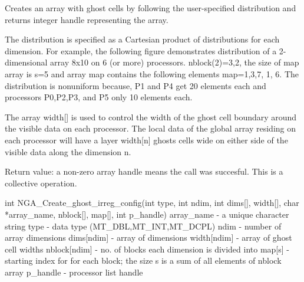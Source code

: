 \documentclass[12pt]{article}
\begin{document}
\begin{desc}

  Creates an array with ghost cells by following the user-specified
  distribution and returns integer handle representing the array.

  The distribution is specified as a Cartesian product of
  distributions for each dimension. For example, the following figure
  demonstrates distribution of a 2-dimensional array 8x10 on 6 (or
  more) processors. nblock(2)={3,2}, the size of map array is s=5 and
  array map contains the following elements map={1,3,7, 1, 6}. The
  distribution is nonuniform because, P1 and P4 get 20 elements each
  and processors P0,P2,P3, and P5 only 10 elements each.
 

  The array width[] is used to control the width of the ghost cell
  boundary around the visible data on each processor. The local data
  of the global array residing on each processor will have a layer
  width[n] ghosts cells wide on either side of the visible data along
  the dimension n.

  Return value: a non-zero array handle means the call was succesful.
  This is a collective operation.


\end{desc}


\begin{capi}
int NGA_Create_ghost_irreg_config(int type, int ndim, int dims[],
             width[], char *array_name, nblock[], map[], int p_handle)
   array_name   - a unique character string                    \access{[input]} 
   type         - data type (MT_DBL,MT_INT,MT_DCPL)            \access{[input]} 
   ndim         - number of array dimensions                   \access{[input]} 
   dims[ndim]   - array of dimensions                          \access{[input]} 
   width[ndim]  - array of ghost cell widths                   \access{[input]} 
   nblock[ndim] - no. of blocks each dimension is divided into \access{[input]} 
   map[s]       - starting index for for each block; the size     
                  s is a sum of all elements of nblock array   \access{[input]} 
   p_handle     - processor list handle                        \access{[input]} 
\end{capi}
\end{document}
